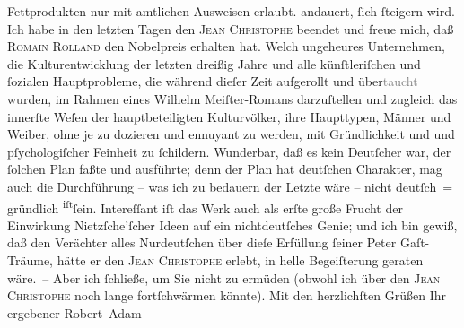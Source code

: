\begin{ledgroupsized}[t]{13cm}
{{{                  Fettprodukten nur mit amtlichen Ausweisen erlaubt.}}}\label{K_L02246-1h} andauert, {\pb}ſich ſteigern wird.\pend
           \pstart
           Ich habe in den letzten Tagen den \textsc{Jean Christophe} beendet und freue mich, daß \textsc{Romain Rolland} den Nobelpreis erhalten hat. Welch
               ungeheures Unternehmen, die Kulturentwicklung der letzten dreißig Jahre und alle
               künſtleriſchen und ſozialen Hauptprobleme, die während dieſer Zeit aufgerollt und
                  über\textcolor{gray}{taucht} wurden, im Rahmen eines Wilhelm Meiſter-Romans darzuſtellen und zugleich das innerſte
               Weſen der hauptbeteiligten Kulturvölker, ihre Haupttypen, Männer und Weiber, ohne je
               zu dozieren und ennuyant zu werden, mit Gründlichkeit und und pſychologiſcher
               Feinheit  zu ſchildern. Wunderbar, daß es kein
               Deutſcher war, der ſolchen Plan faßte und ausführte; denn der Plan hat deutſchen
               Charakter, mag auch die Durchführung – was ich zu bedauern {\pb}der Letzte wäre – nicht deutſch = gründlich \substVorne{}\textsuperscript{iſt}\substDazwischen{}ſein\substHinten{}. Intereſſant iſt das Werk auch als erſte große Frucht der Einwirkung Nietzſche’ſcher Ideen auf ein nichtdeutſches
               Genie; und ich bin gewiß, daß den Verächter alles Nurdeutſchen über dieſe Erfüllung
               ſeiner Peter Gaſt-Träume, hätte er den \textsc{Jean Christophe} erlebt, in helle Begeiſterung geraten wäre. –\pend
           \pstart
           Aber ich ſchließe, um Sie nicht zu ermüden (obwohl ich über den \textsc{Jean Christophe} noch lange fortſchwärmen könnte).\pend
           \pstart
           Mit den herzlichſten Grüßen Ihr ergebener\pend
           \pstart \spacefill\mbox{Robert Adam}\pend{}
         
         \endnumbering{}\end{ledgroupsized}  \newcommand{\dateiname}{L02246}\newcommand{\titel}{Robert Adam an Arthur Schnitzler, 20. 11. 1916}\newcommand{\editorInnen}{Martin Anton Müller und Gerd-Hermann Susen}
      
